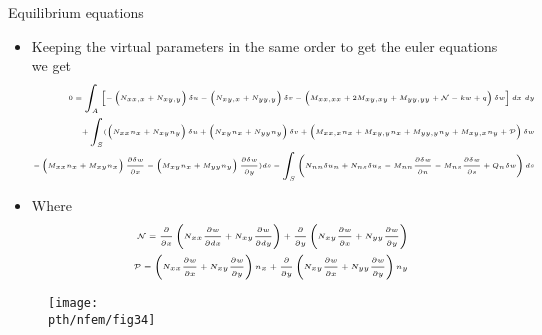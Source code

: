 	\begin{frame}{Equilibrium equations}
		\begin{itemize}
			\item Keeping the virtual parameters in the same order to get the euler equations we get
			\begin{equation}
			\tiny
			\begin{aligned}
				0 = \int_A \left[ -\left(N_{xx,x} + N_{xy,y}\right)\delta u - \left( N_{xy,x} + N_{yy,y}\right)\delta v
		  			- \left(M_{xx,xx} + 2M_{xy,xy} + M_{yy,yy} + \mathcal{N} - kw + q\right) \delta w
							\right] dx~dy \\
				+ \int_S  (\left(N_{xx}n_x + N_{xy}n_y \right)\delta u  
			  + \left(N_{xy}n_x + N_{yy}n_y \right)\delta v
			  + \left( M_{xx,x}n_x + M_{xy,y}n_x + M_{yy,y}n_y + M_{xy,x}n_y + \mathcal{P} \right) \delta w \\
			  - \left(M_{xx}n_x + M_{xy}n_x \right)\frac{\partial \delta w}{\partial x} 
			  -\left(M_{xy}n_x + M_{yy}n_y \right)\frac{\partial \delta w}{\partial y} )ds  
			  -\int_S \left(N_{nn} \delta u_n + N_{ns}\delta u_s - M_{nn}\frac{\partial \delta w}{\partial n} - M_{ns}\frac{\partial \delta w}{\partial s} + Q_n \delta w \right)ds
			\end{aligned}
			\end{equation}
			\item Where 
				\begin{equation}
				\tiny
					\begin{aligned}
					\mathcal{N} = \frac{\partial }{\partial x} \left(N_{xx}\frac{\partial w}{\partial dx}   + N_{xy}\frac{\partial w}{\partial dy}\right)
					 + \frac{\partial }{\partial y} \left(N_{xy}\frac{\partial w}{\partial x} 
					+ N_{yy}\frac{\partial w}{\partial y}\right) \\
					\mathcal{P} = \left(N_{xx}\frac{\partial w}{\partial x}   + N_{xy}\frac{\partial w}{\partial y}\right) n_x
					+ \frac{\partial }{\partial y} \left(N_{xy}\frac{\partial w}{\partial x} 
					+ N_{yy}\frac{\partial w}{\partial y}\right) n_y 
					\end{aligned}
				\end{equation}
		\end{itemize}
	\end{frame}


	\begin{frame}
		\begin{figure}
			\centering
			\texttt{[image: \\pth/nfem/fig34]} 		
		\end{figure}
	\end{frame}


